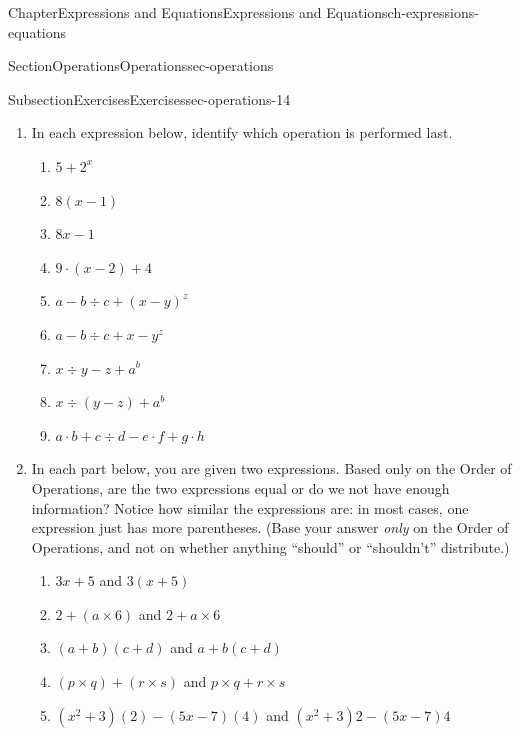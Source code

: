\documentclass[twoside,11pt,]{book}
\numberwithin{equation}{chapter}
\begin{document}
\begin{chapterptx}{Chapter}{Expressions and Equations}{}{Expressions and Equations}{}{}{ch-expressions-equations}
\begin{sectionptx}{Section}{Operations}{}{Operations}{}{}{sec-operations}
\begin{subsectionptx}{Subsection}{Exercises}{}{Exercises}{}{}{sec-operations-14}
\begin{enumerate}
\begin{enumerate}
\item{}\(\displaystyle 8x-1\)%
\item{}\(\displaystyle 9 \cdot (x-2)+4\)%
\item{}\(\displaystyle a - b \div c + (x - y)^z\)%
\item{}\(\displaystyle a - b \div c + x - y^z\)%
\item{}\(\displaystyle x \div y - z + a^b\)%
\item{}\(\displaystyle x \div (y - z) + a^b\)%
\item{}\(\displaystyle a \cdot b + c \div d - e \cdot f + g \cdot h\)%
\end{enumerate}
%
\item{}In each expression below, identify which operation is performed last.%
\begin{enumerate}
\item{}\(\displaystyle 5+2^x\)%
\item{}\(\displaystyle 8(x-1)\)%
\item{}\(\displaystyle 8x-1\)%
\item{}\(\displaystyle 9 \cdot (x-2)+4\)%
\item{}\(\displaystyle a - b \div c + (x - y)^z\)%
\item{}\(\displaystyle a - b \div c + x - y^z\)%
\item{}\(\displaystyle x \div y - z + a^b\)%
\item{}\(\displaystyle x \div (y - z) + a^b\)%
\item{}\(\displaystyle a \cdot b + c \div d - e \cdot f + g \cdot h\)%
\end{enumerate}
%
\item{}In each part below, you are given two expressions. Based only on the Order of Operations, are the two expressions equal or do we not have enough information? Notice how similar the expressions are: in most cases, one expression just has more parentheses. (Base your answer \emph{only} on the Order of Operations, and not on whether anything ``should'' or ``shouldn't'' distribute.)%
\begin{enumerate}
\item{}\(3x+5\) and \(3(x+5)\)%
\item{}\(2 + (a \times 6)\) and \(2 + a \times 6\)%
\item{}\((a+b)(c+d)\) and \(a+b(c+d)\)%
\item{}\((p \times q) + (r \times s)\) and \(p \times q + r \times s\)%
\item{}\((x^2+3)(2) - (5x - 7)(4)\) and \((x^2+3)2 - (5x - 7)4\)%

\end{enumerate}
\end{enumerate}
\end{subsectionptx}
\end{sectionptx}
\end{chapterptx}
\end{document}
